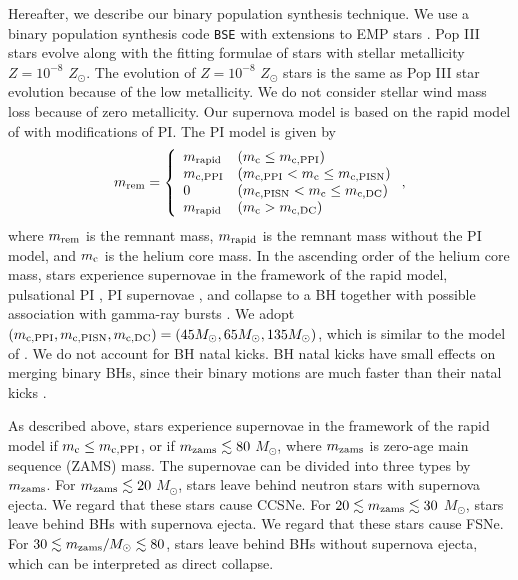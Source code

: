 \documentclass[pdftex]{pasj01}
\newcommand{\msun}{M_\odot}
\newcommand{\zsun}{Z_\odot}
\newcommand{\mzams}{m_{\rm zams}}
\newcommand{\mrem}{m_{\rm rem}}
\newcommand{\mrapid}{m_{\rm rapid}}
\newcommand{\mc}{m_{\rm c}}
\newcommand{\mcppi}{m_{\rm c,PPI}}
\newcommand{\mcpisn}{m_{\rm c,PISN}}
\newcommand{\mcdc}{m_{\rm c,DC}}
\begin{document}
Hereafter, we describe our binary population synthesis technique. We
use a binary population synthesis code {\tt BSE} with extensions to
EMP stars \citep{2020MNRAS.495.4170T, 2021ApJ...910...30T}. Pop III
stars evolve along with the fitting formulae of stars with stellar
metallicity $Z=10^{-8}$ $\zsun$. The evolution of $Z=10^{-8}$ $\zsun$
stars is the same as Pop III star evolution because of the low
metallicity. We do not consider stellar wind mass loss because of zero
metallicity. Our supernova model is based on the rapid model of
\citet{2012ApJ...749...91F} with modifications of PI. The PI model is
given by
\begin{eqnarray}
  \mrem = \displaystyle \left\{
  \begin{array}{ll}
    \mrapid  & (\mc \le \mcppi) \\
    \mcppi   & (\mcppi  < \mc \le \mcpisn) \\
    0        & (\mcpisn < \mc \le \mcdc) \\
    \mrapid  & (\mc > \mcdc)
  \end{array}
  \right., \label{eq:PImodel}
\end{eqnarray}
where $\mrem$ is the remnant mass, $\mrapid$ is the remnant mass
without the PI model, and $\mc$ is the helium core mass. In the
ascending order of the helium core mass, stars experience supernovae
in the framework of the rapid model, pulsational PI
\citep{2002ApJ...567..532H, 2007Natur.450..390W, 2016MNRAS.457..351Y,
  2017ApJ...836..244W, 2019ApJ...887...72L}, PI supernovae
\citep{1967PhRvL..18..379B, 1968Ap&SS...2...96F, 1984ApJ...280..825B,
  1986A&A...167..274E, 2001ApJ...550..372F, 2002ApJ...567..532H,
  2002ApJ...565..385U, 2011ApJ...734..102K, 2012A&A...542A.113Y}, and
collapse to a BH together with possible association with gamma-ray
bursts \citep{2001ApJ...550..372F, 2006ApJ...645..519N,
  2007ApJ...665L..43S, 2007PASJ...59..771S, 2009ApJ...690..913S,
  2011ApJ...726..107S, 2012ApJ...752...32W, 2012ApJ...759..128N,
  2019ApJ...870...98U, 2019PhRvD..99d1302U}. We adopt $(\mcppi,
\mcpisn, \mcdc) = (45 \msun, 65 \msun, 135 \msun)$, which is similar
to the model of \citet{2016A&A...594A..97B}.  We do not account for BH
natal kicks. BH natal kicks have small effects on merging binary BHs,
since their binary motions are much faster than their natal kicks
\citep{2021ApJ...910...30T}.

As described above, stars experience supernovae in the framework of
the rapid model if $\mc \le \mcppi$, or if $\mzams \lesssim 80$
$\msun$, where $\mzams$ is zero-age main sequence (ZAMS) mass. The
supernovae can be divided into three types by $\mzams$. For $\mzams
\lesssim 20$ $\msun$, stars leave behind neutron stars with supernova
ejecta. We regard that these stars cause CCSNe.  For $20 \lesssim
\mzams \lesssim 30$ $\msun$, stars leave behind BHs with supernova
ejecta. We regard that these stars cause FSNe. For $30 \lesssim
\mzams/\msun \lesssim 80$, stars leave behind BHs without supernova
ejecta, which can be interpreted as direct collapse.
\end{document}
